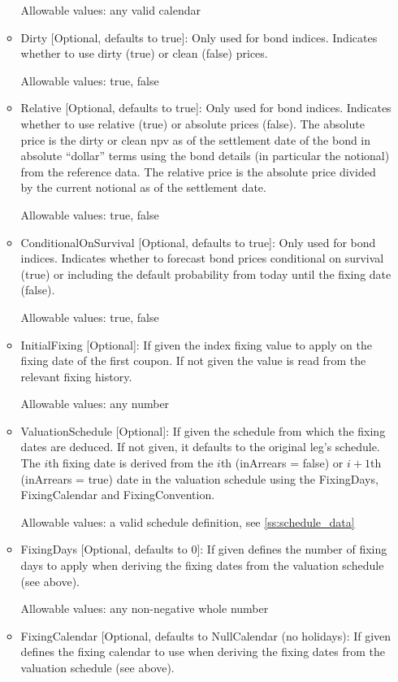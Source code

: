 \begin{itemize}
\begin{itemize}
  Allowable values: any valid calendar

\item Dirty [Optional, defaults to true]: Only used for bond indices. Indicates whether to use dirty (true) or clean
  (false) prices.

  Allowable values: true, false

\item Relative [Optional, defaults to true]: Only used for bond indices. Indicates whether to use relative (true) or
  absolute prices (false). The absolute price is the dirty or clean npv as of the settlement date of the bond in
  absolute ``dollar'' terms using the bond details (in particular the notional) from the reference data. The relative
  price is the absolute price divided by the current notional as of the settlement date.

  Allowable values: true, false

\item ConditionalOnSurvival [Optional, defaults to true]: Only used for bond indices. Indicates whether to forecast bond
  prices conditional on survival (true) or including the default probability from today until the fixing date (false).

  Allowable values: true, false

\item InitialFixing [Optional]: If given the index fixing value to apply on the fixing date of the first coupon. If not
  given the value is read from the relevant fixing history.

  Allowable values: any number

\item ValuationSchedule [Optional]: If given the schedule from which the fixing dates are deduced. If not given, it
  defaults to the original leg's schedule. The $i$th fixing date is derived from the $i$th (inArrears = false) or
  $i+1$th (inArrears = true) date in the valuation schedule using the FixingDays, FixingCalendar and FixingConvention.

  Allowable values: a valid schedule definition, see \ref{ss:schedule_data}

\item FixingDays [Optional, defaults to 0]: If given defines the number of fixing days to apply when deriving the fixing
  dates from the valuation schedule (see above).

  Allowable values: any non-negative whole number

\item FixingCalendar [Optional, defaults to NullCalendar (no holidays): If given defines the fixing calendar to use when
  deriving the fixing dates from the valuation schedule (see above).


\end{itemize}
\end{itemize}
